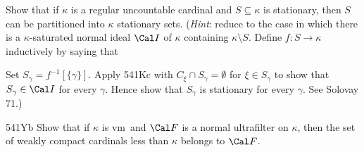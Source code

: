 {
Show that if $\kappa$ is a regular uncountable cardinal and
$S\subseteq\kappa$ is stationary, then $S$ can be partitioned into
$\kappa$ stationary sets.   ({\it Hint\/}:  reduce to the case in which there is a
$\kappa$-saturated normal ideal $\Cal I$ of $\kappa$ containing
$\kappa\setminus S$.   Define $f:S\to\kappa$ inductively by saying that


\noindent Set $S_{\gamma}=f^{-1}[\{\gamma\}]$.   Apply 541Kc with
$C_{\xi}\cap S_{\gamma}=\emptyset$ for $\xi\in S_{\gamma}$ to show that
$S_{\gamma}\in\Cal I$ for every $\gamma$.   Hence show that $S_{\gamma}$
is stationary for every $\gamma$.   See
{\smc Solovay 71}.)

\spheader 541Yb Show that if $\kappa$ is
\2vm\ and $\Cal F$ is a normal ultrafilter on $\kappa$, then the set of
weakly compact cardinals less than $\kappa$ belongs to $\Cal F$.
}%

